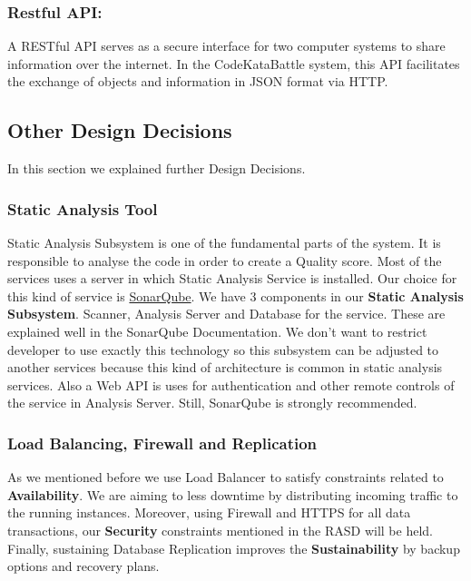 \subsubsection{Restful API:} A RESTful API serves as a secure interface for two computer systems to share information over the internet. In the CodeKataBattle system, this API facilitates the exchange of objects and information in JSON format via HTTP.

\subsection{Other Design Decisions}
In this section we explained further Design Decisions.
\subsubsection{Static Analysis Tool}
Static Analysis Subsystem is one of the fundamental parts of the system. It is responsible to analyse the code in order to create a Quality score. Most of the services uses a server in which Static Analysis Service is installed. Our choice for this kind of service is \hyperlink{https://docs.sonarsource.com/sonarqube/latest/}{SonarQube}. We have 3 components in our \textbf{Static Analysis Subsystem}. Scanner, Analysis Server and Database for the service. These are explained well in the SonarQube Documentation. We don't want to restrict developer to use exactly this technology so this subsystem can be adjusted to another services because this kind of architecture is common in static analysis services. Also a Web API is uses for authentication and other remote controls of the service in Analysis Server. Still, SonarQube is strongly recommended.
\subsubsection{Load Balancing, Firewall and Replication}
As we mentioned before we use Load Balancer to satisfy constraints related to \textbf{Availability}. We are aiming to less downtime by distributing incoming traffic to the running instances. Moreover, using Firewall and HTTPS for all data transactions, our \textbf{Security} constraints mentioned in the RASD will be held. Finally, sustaining Database Replication improves the \textbf{Sustainability}
by backup options and recovery plans. 

